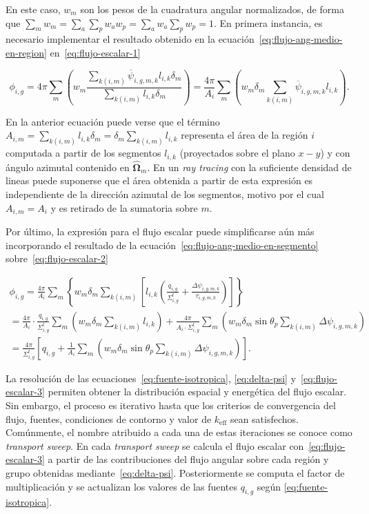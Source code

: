 \documentclass[11pt]{article}
\begin{document}
\noindent
En este caso, $w_m$ son los pesos de la cuadratura angular normalizados, de forma que $\sum_m w_m = \sum_a \sum_p w_a w_p = \sum_a w_a \sum_p w_p = 1$. En primera instancia, es necesario implementar el resultado obtenido en la ecuación~\eqref{eq:flujo-ang-medio-en-region} en~\eqref{eq:flujo-escalar-1}

\begin{equation} \label{eq:flujo-escalar-2}
 \phi_{i,g} =
 4\pi \sum_m \left( w_m \frac{\sum_{k(i,m)} \overline{\psi}_{i,g,m,k} l_{i,k} \delta_m}{\sum_{k(i,m)} l_{i,k} \delta_m} \right) = 
 \frac{4\pi}{A_i} \sum_m \left( w_m \delta_m \sum_{k(i,m)} \overline{\psi}_{i,g,m,k} l_{i,k} \right).
\end{equation}

\noindent
En la anterior ecuación puede verse que el t\'ermino $A_{i,m} = \sum_{k(i,m)} l_{i,k} \delta_m = \delta_m \sum_{k(i,m)} l_{i,k}$ representa el área de la región $i$ computada a partir de los segmentos $l_{i,k}$ (proyectados sobre el plano $x - y$) y con ángulo azimutal contenido en $\boldsymbol{\hat{\Omega}}_m$. En un \emph{ray tracing} con la suficiente densidad de lineas puede suponerse que el área obtenida a partir de esta expresi\'on es independiente de la dirección azimutal de los segmentos, motivo por el cual $A_{i,m} = A_i$ y es retirado de la sumatoria sobre $m$.

Por último, la expresi\'on para el flujo escalar puede simplificarse aún m\'as incorporando el resultado de la ecuación~\eqref{eq:flujo-ang-medio-en-segmento} sobre~\eqref{eq:flujo-escalar-2}

\begin{multline} \label{eq:flujo-escalar-3}
 \phi_{i,g} =
 \frac{4\pi}{A_i} \sum_m \left\lbrace w_m \delta_m \sum_{k(i,m)} \left[ l_{i,k} \left( \frac{q_{i,g}}{\Sigma^t_{i,g}} + \frac{\Delta \psi_{i,g,m,k}}{\tau_{i,g,m,k}} \right) \right] \right\rbrace \\ 
 = \frac{4\pi}{A_i} \cdot \frac{q_{i,g}}{\Sigma^t_{i,g}} \sum_m \left( w_m \delta_m \sum_{k(i,m)} l_{i,k} \right) + \frac{4\pi}{A_i \cdot \Sigma^t_{i,g}} \sum_m \left( w_m \delta_m \sin \theta_p \sum_{k(i,m)} \Delta \psi_{i,g,m,k} \right) \\ 
 = \frac{4\pi}{\Sigma^t_{i,g}} \left[ q_{i,g} + \frac{1}{A_i} \sum_m \left( w_m \delta_m \sin \theta_p \sum_{k(i,m)} \Delta \psi_{i,g,m,k} \right) \right]
 .
\end{multline}

La resolución de las ecuaciones~\eqref{eq:fuente-isotropica}, \eqref{eq:delta-psi} y~\eqref{eq:flujo-escalar-3} permiten obtener la distribución espacial y energética del flujo escalar. Sin embargo, el proceso es iterativo hasta que los criterios de convergencia del flujo, fuentes, condiciones de contorno y valor de $k_{\text{eff}}$ sean satisfechos. Comúnmente, el nombre atribuido a cada una de estas iteraciones se conoce como \emph{transport sweep}. En cada \emph{transport sweep} se calcula el flujo escalar con~\eqref{eq:flujo-escalar-3} a partir de las contribuciones del flujo angular sobre cada región y grupo obtenidas mediante~\eqref{eq:delta-psi}. Posteriormente se computa el factor de multiplicación y se actualizan los valores de las fuentes $q_{i,g}$ seg\'un \eqref{eq:fuente-isotropica}.
\end{document}
